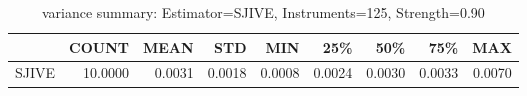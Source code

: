 \begin{table}[ht]
\centering
\caption{variance summary: Estimator=SJIVE, Instruments=125, Strength=0.90}
\begin{tabular}{lrrrrrrrr}
\toprule
 & COUNT & MEAN & STD & MIN & 25\% & 50\% & 75\% & MAX \\
\midrule
SJIVE & 10.0000 & 0.0031 & 0.0018 & 0.0008 & 0.0024 & 0.0030 & 0.0033 & 0.0070 \\
\bottomrule
\end{tabular}
\end{table}
